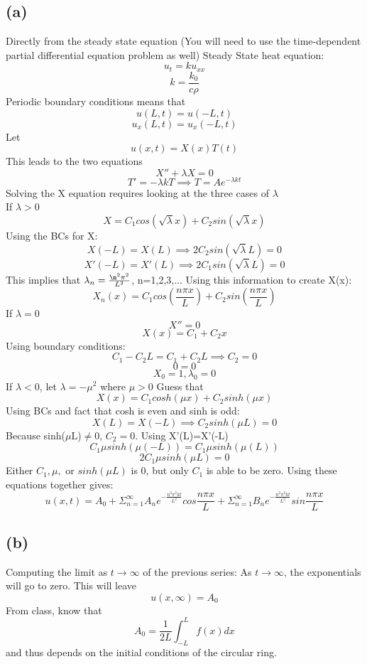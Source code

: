 \documentclass[preview,12pt]{article}
\begin{document}
    \subsection*{(a)}
        Directly from the steady state equation (You will need to use the time-dependent partial differential equation problem as well) \newline
        Steady State heat equation:
        $$u_t=ku_{xx}$$
        $$k=\frac{k_0}{c\rho}$$
        Periodic boundary conditions means that
        $$u(L,t)=u(-L,t)$$
        $$u_x(L,t)=u_x(-L,t)$$
        Let
        $$u(x,t)=X(x)T(t)$$
        This leads to the two equations
        $$X''+\lambda X = 0$$
        $$T' = -\lambda k T \implies T=Ae^{-\lambda kt}$$
        Solving the X equation requires looking at the three cases of $\lambda$ 
        $$$$
        If $\lambda>0$
        $$X=C_1 cos(\sqrt{\lambda}x)+C_2sin(\sqrt{\lambda}x)$$
        Using the BCs for X:
        $$X(-L)=X(L) \implies 2C_2sin(\sqrt{\lambda}L)=0$$
        $$X'(-L)=X'(L) \implies 2C_1sin(\sqrt{\lambda}L)=0$$
        This implies that $\lambda_n=\frac{\n^2\pi^2}{L^2}$, n=1,2,3,... \newline
        Using this information to create X(x):
        $$X_n(x)=C_1cos(\frac{n\pi x}{L})+C_2sin(\frac{n\pi x}{L})$$
        $$$$
        If $\lambda=0$
        $$X''=0$$
        $$X(x)=C_1+C_2x$$
        Using boundary conditions:
        $$C_1-C_2L=C_1+C_2L \implies C_2=0$$
        $$0=0$$
        $$X_0=1, \lambda_0=0$$
        $$$$
        If $\lambda<0$, let $\lambda=-\mu^2$ where $\mu>0$
        Guess that 
        $$X(x)=C_1cosh(\mu x)+C_2 sinh(\mu x)$$
        Using BCs and fact that cosh is even and sinh is odd:
        $$X(L)=X(-L) \implies C_2sinh(\mu L)=0$$
        Because sinh($\mu$L)$\neq$0, $C_2=0$. \newline
        Using X'(L)=X'(-L)
        $$C_1\mu sinh(\mu(-L))=C_1\mu sinh(\mu(L))$$
        $$2C_1\mu sinh(\mu L)=0$$
        Either $C_1, \mu,$ or $sinh(\mu L)$ is 0, but only $C_1$ is able to be zero. \newline
        Using these equations together gives:
        $$u(x,t)=A_0+\Sigma_{n=1}^\infty A_ne^{-\frac{n^2\pi^2kt}{L^2}}cos\frac{n\pi x}{L}+\Sigma_{n=1}^\infty B_ne^{-\frac{n^2\pi^2kt}{L^2}}sin\frac{n\pi x}{L}$$
        
    \subsection*{(b)}
        Computing the limit as $t\rightarrow{}\infty$ of the previous series: \newline
        As $t\rightarrow{}\infty$, the exponentials will go to zero.  This will leave 
        $$u(x,\infty)=A_0$$
        From class, know that
        $$A_0=\frac{1}{2L}\int_{-L}^Lf(x)dx$$
        and thus depends on the initial conditions of the circular ring.
\end{document}
